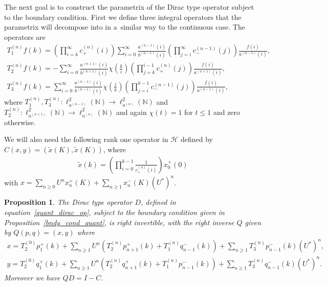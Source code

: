 \documentclass[11pt]{article}
\numberwithin{equation}{section}
\newtheorem{prop}[theo]{Proposition}
{\theoremstyle{definition}
\newtheorem{rem}[theo]{Remark}
\newtheorem{defin}[theo]{Definition}
}
\begin{document}
The next goal is to construct the parametrix of the Dirac type operator subject to the boundary condition.
First we def\/ine three integral operators that the parametrix will decompose into in a~similar way to the continuous
case.
The operators are
\begin{gather}
T_1^{(n)}f(k) = \left(\prod\limits_{i=k}^\infty c_+^{(n)}(i)\right)\sum\limits_{i=0}^\infty
\frac{a^{(n-1)}(i)}{b^{(n-1)}(i)}\left(\prod\limits_{j=i}^\infty c_-^{(n-1)}(j)\right)\frac{f(i)}{a^{(n-1)}(i)},
\nonumber
\\
T_2^{(n)}f(k) = -\sum\limits_{i=0}^\infty\frac{a^{(n+1)}(i)}{b^{(n+1)}(i)}\chi\left(\frac{k}{i}\right)
\left(\prod\limits_{j=k}^{i-1}c_+^{(n)}(j)\right)\frac{f(i)}{a^{(n+1)}(i)},
\nonumber
\\
T_3^{(n)}f(k) = \sum\limits_{i=0}^\infty
\frac{a^{(n-1)}(i)}{b^{(n-1)}(i)}\chi\left(\frac{i}{k}\right)\left(\prod\limits_{j=i}^{k-1}c_-^{(n-1)}(j)\right)\frac{f(i)}{a^{(n-1)}(i)},
\label{int_ops_quant}
\end{gather}
where $T_1^{(n)}, T_3^{(n)}: \ell_{a^{(n-1)}}^2({\mathbb N})\to\ell_{a^{(n)}}^2({\mathbb N})$ and $T_2^{(n)}:
\ell_{a^{(n+1)}}^2({\mathbb N}) \to \ell_{a^{(n)}}^2({\mathbb N})$ and again $\chi(t)=1$ for $t\le1$ and zero otherwise.

We will also need the following rank one operator in $\mathcal{H}$ def\/ined by $C(x,y) = (\tilde x(K),\tilde x(K))$,
where
\begin{gather*}
\tilde x(k) = \left(\prod\limits_{i=0}^{k-1}\frac{1}{c_+^{(n)}(i)}\right)x_0^+(0)
\end{gather*}
with $x= \sum\limits_{n\ge0} U^n x_n^+(K) + \sum\limits_{n\ge1} x_n^-(K)(U^*)^n$.

\begin{prop}
\label{quant_para}
The Dirac type operator $D$, defined in equation~\eqref{quant_dirac_op}, subject to the boundary condition given in
Proposition~{\rm \ref{bndy_cond_quant}}, is right invertible, with the right inverse $Q$ given by $Q(p,q)=({x},{y})$ where
\begin{gather*}
{x} = T_2^{(0)}p_1^+(k) + \sum\limits_{n\ge 1}U^n\left(T_2^{(n)}p_{n+1}^+(k) + T_1^{(n)}q_{n-1}^-(k)\right) +
\sum\limits_{n\ge1} T_3^{(n)}p_{n-1}^-(k)(U^*)^n,
\\
{y} = T_2^{(0)}q_1^+(k) + \sum\limits_{n\ge 1}U^n\left(T_2^{(n)}q_{n+1}^+(k) + T_1^{(n)}p_{n-1}^-(k)\right) +
\sum\limits_{n\ge1} T_3^{(n)}q_{n-1}^-(k)(U^*)^n.
\end{gather*}
Moreover we have $QD = I - C$.
\end{prop}
\end{document}
